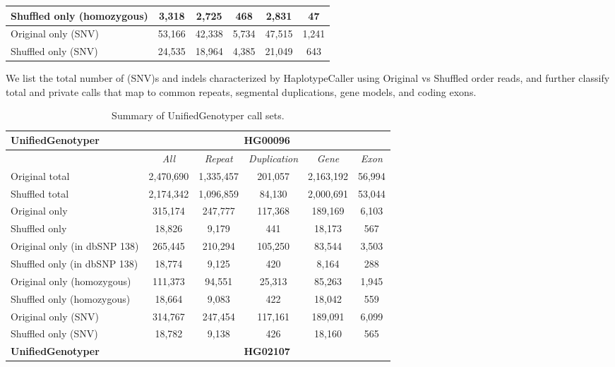 \begin{table}[htb]
\begin{center}
\begin{tabular}{|l|c||c|c|c|c|}
\hline
Shuffled only (homozygous) & 3,318 & 2,725 & 468 & 2,831 & 47 \\
\hline
Original only (SNV) & 53,166 & 42,338 & 5,734 & 47,515 & 1,241 \\
\hline
Shuffled only (SNV) & 24,535 & 18,964 & 4,385 & 21,049 & 643 \\ 
\hline
\end{tabular}
\end{center}
{\footnotesize We list the total number of (SNV)s and indels characterized by HaplotypeCaller using Original vs Shuffled order reads, 
and further classify total and private calls that map to common repeats, segmental duplications, gene models, and coding exons.}
\label{supptab:orig-vs-shuf-hc}
\end{table}

\begin{table}[htb]
\caption{ Summary of UnifiedGenotyper call sets. }
\begin{center}
\begin{tabular}{|l|c||c|c|c|c|}
\hline
{\bf UnifiedGenotyper} & \multicolumn{5}{|c|}{\bf HG00096} \\
\hline
\cline{2-6}
{\bf} & {\it All} & {\it Repeat} & {\it Duplication} & {\it Gene} & {\it Exon} \\
\hline
Original total & 2,470,690 & 1,335,457 & 201,057 & 2,163,192 & 56,994 \\
\hline
Shuffled total & 2,174,342 & 1,096,859 & 84,130 & 2,000,691 & 53,044 \\
\hline
Original only & 315,174 & 247,777 & 117,368 & 189,169 & 6,103 \\
\hline
Shuffled only & 18,826 & 9,179 & 441 & 18,173 & 567 \\
\hline
Original only (in dbSNP 138) & 265,445 & 210,294 & 105,250 & 83,544 & 3,503 \\
\hline
Shuffled only (in dbSNP 138) & 18,774 & 9,125 & 420 & 8,164 & 288 \\
\hline
Original only (homozygous) & 111,373 & 94,551 & 25,313 & 85,263 & 1,945 \\
\hline
Shuffled only (homozygous) & 18,664 & 9,083 & 422 & 18,042 & 559 \\
\hline
Original only (SNV) & 314,767 & 247,454 & 117,161 & 189,091 & 6,099 \\
\hline
Shuffled only (SNV) & 18,782 & 9,138 & 426 & 18,160 & 565 \\ 
\hline
\hline
{\bf UnifiedGenotyper} & \multicolumn{5}{|c|}{\bf HG02107} \\

\end{tabular}
\end{center}
\end{table}
